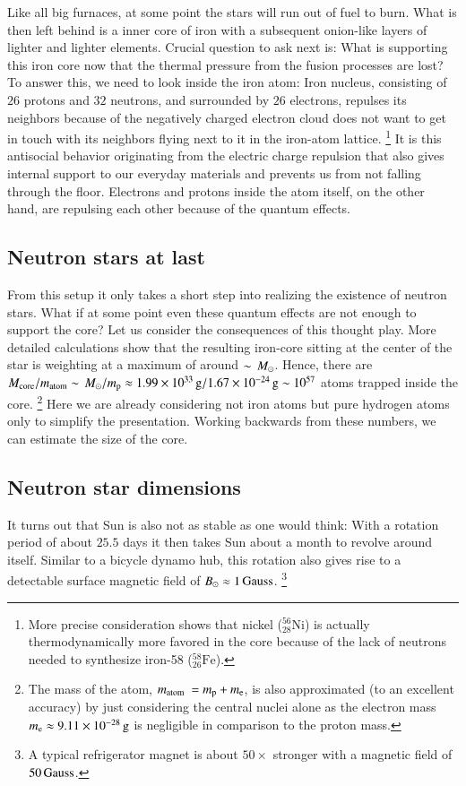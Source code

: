 Like all big furnaces, at some point the stars will run out of fuel to burn.
What is then left behind is a inner core of iron with a subsequent onion-like layers of lighter and lighter elements.
Crucial question to ask next is: 
What is supporting this iron core now that the thermal pressure from the fusion processes are lost?
To answer this, we need to look inside the iron atom:
Iron nucleus, consisting of $26$ protons and $32$ neutrons, and surrounded by $26$ electrons, repulses its neighbors because of the negatively charged electron cloud does not want to get in touch with its neighbors flying next to it in the iron-atom lattice.
\footnote{More precise consideration shows that nickel ($^{56}_{28}\mathrm{Ni}$) is actually thermodynamically more favored in the core because of the lack of neutrons needed to synthesize iron-58 ($^{58}_{26}\mathrm{Fe}$).
}
It is this antisocial behavior originating from the electric charge repulsion that also gives internal support to our everyday materials and prevents us from not falling through the floor.
Electrons and protons inside the atom itself, on the other hand, are repulsing each other because of the quantum effects.

\subsection{Neutron stars at last}
From this setup it only takes a short step into realizing the existence of neutron stars.
What if at some point even these quantum effects are not enough to support the core?
Let us consider the consequences of this thought play.
More detailed calculations show that the resulting iron-core sitting at the center of the star is weighting at a maximum of around $\sim \, M_{\odot}$.
Hence, there are $M_{\mathrm{core}} / m_{\mathrm{atom}} \sim \, M_{\odot} / m_{\mathrm{p}} \approx 1.99 \times 10^{33} \, \mathrm{g} / 1.67 \times 10^{-24} \, \mathrm{g} \sim 10^{57}$ atoms trapped inside the core.
\footnote{
    The mass of the atom, $m_{\mathrm{atom}} = \mproton + \me$, is also approximated (to an excellent accuracy) by just considering the central nuclei alone as the electron mass $m_{\mathrm{e}} \approx 9.11 \times 10^{-28} \, \mathrm{g}$ is negligible in comparison to the proton mass.
}
Here we are already considering not iron atoms but pure hydrogen atoms only to simplify the presentation.
Working backwards from these numbers, we can estimate the size of the core.



\subsection{Neutron star dimensions}
It turns out that Sun is also not as stable as one would think:
With a rotation period of about $25.5$ days it then takes Sun about a month to revolve around itself.
Similar to a bicycle dynamo hub, this rotation also gives rise to a detectable surface magnetic field of $B_{\odot} \approx 1 \, \mathrm{Gauss}$.%
\footnote{A typical refrigerator magnet is about $50\times$ stronger with a magnetic field of $50\, \mathrm{Gauss}$.}

